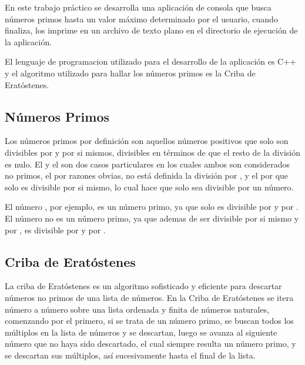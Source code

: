 \documentclass[12pt]{article}
\begin{document}
En este trabajo práctico se desarrolla una aplicación de consola que busca
números primos hasta un valor máximo determinado por el usuario, cuando
finaliza, los imprime en un archivo de texto plano en el directorio de ejecución
de la aplicación.

El lenguaje de programacion utilizado para el desarrollo de la aplicación es C++
y el algoritmo utilizado para hallar los números primos es la Criba de
Eratóstenes.

\subsection{Números Primos}

Los números primos por definición son aquellos números positivos que solo son
divisibles por  y por si mismos, divisibles en términos de que el resto
de la división es nulo. El  y el  son dos casos particulares en
los cuales ambos son considerados no primos, el  por razones obvias, no
está definida la división por , y el  por que solo es divisible
por si mismo, lo cual hace que solo sea divisible por un número.

El número , por ejemplo, es un número primo, ya que solo es divisible
por  y por . El número  no es un número primo, ya que
ademas de ser divisible por si mismo y por , es divisible por  y
por .

% 

\subsection{Criba de Eratóstenes}

La criba de Eratóstenes es un algoritmo sofisticado y eficiente para descartar
números no primos de una lista de números. En la Criba de Eratóstenes se itera
número a número sobre una lista ordenada y finita de números naturales,
comenzando por el primero, si se trata de un número primo, se buscan todos los
múltiplos en la lista de números y se descartan, luego se avanza al siguiente
número que no haya sido descartado, el cual siempre resulta un número primo, y
se descartan sus múltiplos, así sucesivamente hasta el final de la lista. 
\end{document}
